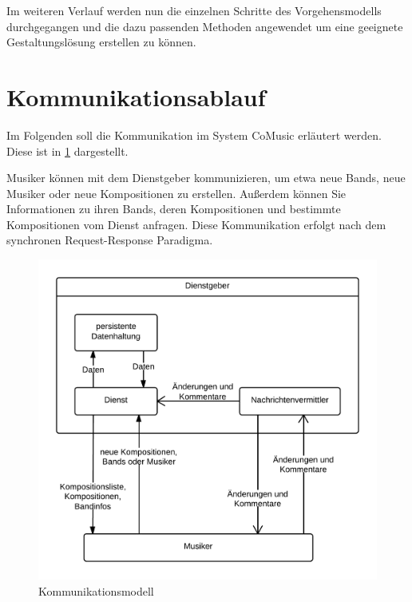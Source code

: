 \documentclass[12pt]{scrartcl}
\begin{document}
Im weiteren Verlauf werden nun die einzelnen Schritte des Vorgehensmodells durchgegangen und die dazu passenden Methoden angewendet um eine geeignete Gestaltungslösung erstellen zu können.


\section{Kommunikationsablauf}



Im Folgenden soll die Kommunikation im System CoMusic erläutert werden. Diese ist in \ref{fig:kommunikationsmodell} dargestellt.

Musiker können mit dem Dienstgeber kommunizieren, um etwa neue Bands, neue Musiker oder neue Kompositionen zu erstellen. Außerdem können Sie Informationen zu ihren Bands, deren Kompositionen und bestimmte Kompositionen vom Dienst anfragen. Diese Kommunikation erfolgt nach dem synchronen Request-Response Paradigma.

\begin{figure}
\centering
\includegraphics[scale=.25]{figures/kommunikationsmodell}
\caption{Kommunikationsmodell}
\label{fig:kommunikationsmodell}
\end{figure}
\end{document}

